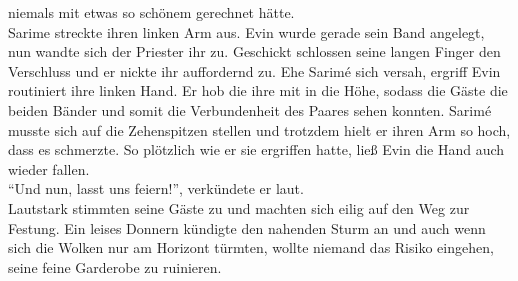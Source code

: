 niemals mit etwas so schönem gerechnet hätte.\\
Sarime streckte ihren linken Arm aus. Evin wurde gerade sein Band angelegt, nun wandte sich der 
Priester ihr zu. Geschickt schlossen seine langen Finger den Verschluss und er nickte ihr 
auffordernd zu. Ehe Sarimé sich versah, ergriff Evin routiniert ihre linken Hand. Er hob die ihre 
mit in die Höhe, sodass die Gäste die beiden Bänder und somit die Verbundenheit des Paares sehen 
konnten. Sarimé musste sich auf die Zehenspitzen stellen und trotzdem hielt er ihren Arm so hoch, 
dass es schmerzte. So plötzlich wie er sie ergriffen hatte, ließ Evin die Hand auch wieder fallen.\\
``Und nun, lasst uns feiern!'', verkündete er laut.\\
Lautstark stimmten seine Gäste zu und machten sich eilig auf den Weg zur Festung. Ein leises 
Donnern kündigte den nahenden Sturm an und auch wenn sich die Wolken nur am Horizont türmten, 
wollte niemand das Risiko eingehen, seine feine Garderobe zu ruinieren.\\


